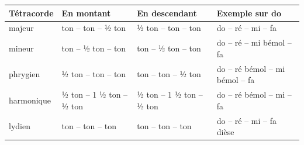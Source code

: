 
\begin{tabular}{@{}l l l l@{}}
\toprule
\textbf{Tétracorde} & \textbf{En montant} & \textbf{En descendant} & \textbf{Exemple sur do} \\
\midrule
majeur & ton -- ton -- ½ ton & ½ ton -- ton -- ton & do -- ré -- mi -- fa \\
mineur & ton -- ½ ton -- ton & ton -- ½ ton -- ton & do -- ré -- mi bémol -- fa \\
phrygien & ½ ton -- ton -- ton & ton -- ton -- ½ ton & do -- ré bémol -- mi bémol -- fa \\
harmonique & ½ ton -- 1 ½ ton -- ½ ton & ½ ton -- 1 ½ ton -- ½ ton & do -- ré bémol -- mi -- fa \\
lydien & ton -- ton -- ton & ton -- ton -- ton & do -- ré -- mi -- fa dièse \\
\bottomrule
\end{tabular}


